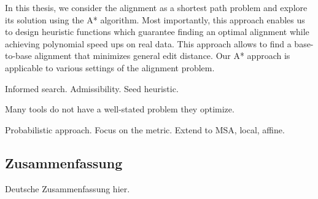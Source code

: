 In this thesis, we consider the alignment as a shortest path problem and explore
its solution using the A* algorithm. Most importantly, this approach enables us
to design heuristic functions which guarantee finding an optimal alignment while
achieving polynomial speed ups on real data. This approach allows to find a
base-to-base alignment that minimizes general edit distance. Our A* approach is
applicable to various settings of the alignment problem.

Informed search. Admissibility. Seed heuristic.

Many tools do not have a well-stated problem they optimize.

Probabilistic approach.
Focus on the metric.
Extend to MSA, local, affine.

\endgroup

\cleardoublepage%

\begingroup
\let\clearpage\relax
\let\cleardoublepage\relax
\let\cleardoublepage\relax

\begin{otherlanguage}{ngerman}
\chapter*{Zusammenfassung}

Deutsche Zusammenfassung hier.

\end{otherlanguage}

\endgroup

\vfill